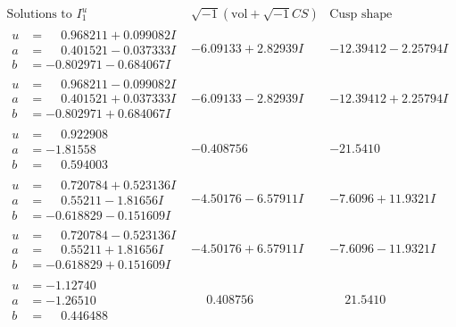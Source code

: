 \documentclass[1p]{elsarticle_modified}
\theoremstyle{definition}
\newcommand{\I}{\sqrt{-1}}
\begin{document}
$$\begin{array}{c|c|c}  
\text{Solutions to }I^u_{1}& \I (\text{vol} + \sqrt{-1}CS) & \text{Cusp shape}\\
 \hline 
\begin{aligned}
u &= \phantom{-}0.968211 + 0.099082 I \\
a &= \phantom{-}0.401521 - 0.037333 I \\
b &= -0.802971 - 0.684067 I\end{aligned}
 & -6.09133 + 2.82939 I & -12.39412 - 2.25794 I \\ \hline\begin{aligned}
u &= \phantom{-}0.968211 - 0.099082 I \\
a &= \phantom{-}0.401521 + 0.037333 I \\
b &= -0.802971 + 0.684067 I\end{aligned}
 & -6.09133 - 2.82939 I & -12.39412 + 2.25794 I \\ \hline\begin{aligned}
u &= \phantom{-}0.922908\phantom{ +0.000000I} \\
a &= -1.81558\phantom{ +0.000000I} \\
b &= \phantom{-}0.594003\phantom{ +0.000000I}\end{aligned}
 & -0.408756\phantom{ +0.000000I} & -21.5410\phantom{ +0.000000I} \\ \hline\begin{aligned}
u &= \phantom{-}0.720784 + 0.523136 I \\
a &= \phantom{-}0.55211 - 1.81656 I \\
b &= -0.618829 - 0.151609 I\end{aligned}
 & -4.50176 - 6.57911 I & -7.6096 + 11.9321 I \\ \hline\begin{aligned}
u &= \phantom{-}0.720784 - 0.523136 I \\
a &= \phantom{-}0.55211 + 1.81656 I \\
b &= -0.618829 + 0.151609 I\end{aligned}
 & -4.50176 + 6.57911 I & -7.6096 - 11.9321 I \\ \hline\begin{aligned}
u &= -1.12740\phantom{ +0.000000I} \\
a &= -1.26510\phantom{ +0.000000I} \\
b &= \phantom{-}0.446488\phantom{ +0.000000I}\end{aligned}
 & \phantom{-}0.408756\phantom{ +0.000000I} & \phantom{-}21.5410\phantom{ +0.000000I} \\ \hline\begin{aligned}

\end{aligned}
\end{array}$$
\end{document}
